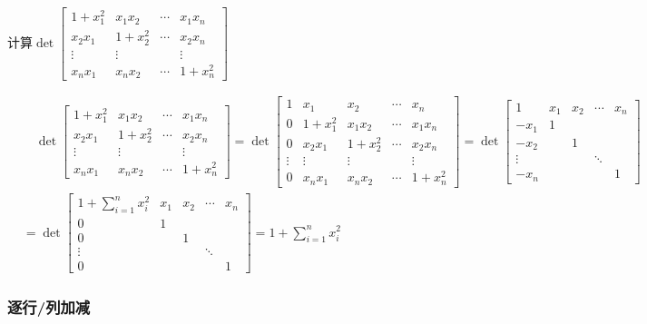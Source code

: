                 \begin{example}
                    计算$\det\begin{bmatrix}1+x_1^2&x_1 x_2&\cdots&x_1 x_n\\x_2 x_1&1+x_2^2&\cdots&x_2 x_n\\\vdots&\vdots&&\vdots\\x_n x_1&x_n x_2&\cdots&1+x_n^2\end{bmatrix}$
                \end{example}

                \begin{solution}
                    \begin{align*}
                        &\quad\det\begin{bmatrix}1+x_1^2&x_1 x_2&\cdots&x_1 x_n\\x_2 x_1&1+x_2^2&\cdots&x_2 x_n\\\vdots&\vdots&&\vdots\\x_n x_1&x_n x_2&\cdots&1+x_n^2\end{bmatrix}=\det\begin{bmatrix}1&x_1&x_2&\cdots&x_n\\0&1+x_1^2&x_1 x_2&\cdots&x_1 x_n\\0&x_2 x_1&1+x_2^2&\cdots&x_2 x_n\\\vdots&\vdots&\vdots&&\vdots\\0&x_n x_1&x_n x_2&\cdots&1+x_n^2\end{bmatrix}=\det\begin{bmatrix}1&x_1&x_2&\cdots&x_n\\-x_1&1&&&\\-x_2&&1&&\\\vdots&&&\ddots&\\-x_n&&&&1\end{bmatrix} \\
                        &=\det\begin{bmatrix}1+\sum_{i=1}^n x_i^2&x_1&x_2&\cdots&x_n\\0&1&&&\\0&&1&&\\\vdots&&&\ddots&\\0&&&&1\end{bmatrix}=1+\sum_{i=1}^n x_i^2
                    \end{align*}
                \end{solution}

            \subsubsection{逐行/列加减}

